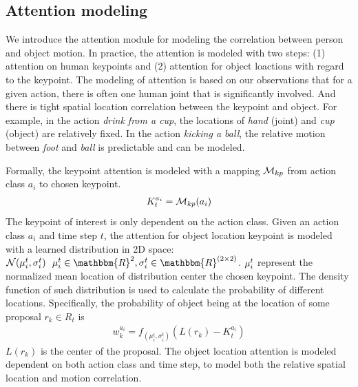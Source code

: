 \subsection{Attention modeling}
We introduce the attention module for modeling the correlation between person and object motion. In practice, the attention is modeled with two steps: (1) attention on human keypoints and (2) attention for object loactions with regard to the keypoint. The modeling of attention is based on our observations that for a given action, there is often one human joint that is significantly involved. And there is tight spatial location correlation between the keypoint and object. For example, in the action \textit{drink from a cup}, the locations of \textit{hand} (joint) and \textit{cup} (object) are relatively fixed. In the action \textit{kicking a ball}, the relative motion between \textit{foot} and \textit{ball} is predictable and can be modeled.

Formally, the keypoint attention is modeled with a mapping ${\mathcal M}_{kp}$ from action class $a_i$ to chosen keypoint. 
\begin{align}
K_t^{a_i} = {\mathcal M}_{kp}(a_i)
\end{align}
The keypoint of interest is only dependent on the action class.
Given an action class $a_i$ and time step $t$, the attention for object location \wrt keypoint is modeled with a learned distribution in 2D space: $\scr{N}(\ve{\mu}_i^t, \ve{\sigma}_i^t)~~\ve{\mu}_i^t\in \mathbbm{R}^2, \ve{\sigma}_i^t\in \mathbbm{R}^{(2\times2)}$. ${\mathbf \mu}_i^t$ represent the normalized mean location of distribution center \wrt the chosen keypoint. The density function of such distribution is used to calculate the probability of different locations. Specifically, the probability of object being at the location of some proposal $r_k\in R_t$ is 
\begin{align}
w_k^{a_i}=f_{(\mu_i^t, \sigma_i^t)}(L(r_k)-K_t^{a_i})
\end{align}
$L(r_k)$ is the center of the proposal. The object location attention is modeled dependent on both action class and time step, to model both the relative spatial location and motion correlation. 

